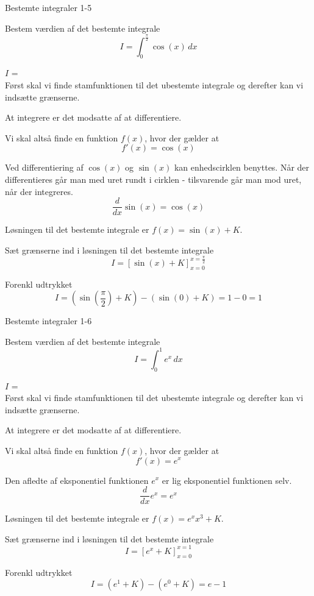 \documentclass{article}
\begin{document}
\newpage

\begin{exercise}{Bestemte integraler 1-5}
	
		Bestem værdien af det bestemte integrale
	\[
	I = \int_0^{\frac{\pi}{2}} \cos(x) \, dx
	\]
	
	$I$ =  \\
	
	
	\hint
	Først skal vi finde stamfunktionen til det ubestemte integrale og derefter kan vi indsætte grænserne.
	
	\hint
	At integrere er det modsatte af at differentiere.
	
	\hint
	Vi skal altså finde en funktion $f(x)$, hvor der gælder at
	\[
	f'(x) = \cos(x)
	\]
	
	\hint
	Ved differentiering af $\cos(x)$ og $\sin(x)$ kan enhedscirklen benyttes. Når der differentieres går man med uret rundt i cirklen - tilsvarende går man mod uret, når der integreres. 
	\[
	\frac{d}{dx} \sin(x) = \cos(x)
	\]
	
	\hint
	Løsningen til det bestemte integrale er $f(x) = \sin(x) + K$.
	
	\hint
	Sæt grænserne ind i løsningen til det bestemte integrale
	\[
	I = \left[ \sin(x) + K \right]_{x=0}^{x=\frac{\pi}{2}}
	\]
	
	\hint
	Forenkl udtrykket
	\[
	I = \left( \sin\left(\frac{\pi}{2}\right) + K \right) - \left( \sin(0) + K \right) = 1 - 0 = 1
	\]
	
	
	
\end{exercise}

\newpage

\begin{exercise}{Bestemte integraler 1-6}
	
	Bestem værdien af det bestemte integrale
	\[
	I = \int_0^1 e^x \, dx
	\]
	
	$I$ =  \\
	
	
	\hint
	Først skal vi finde stamfunktionen til det ubestemte integrale og derefter kan vi indsætte grænserne.
	
	\hint
	At integrere er det modsatte af at differentiere.
	
	\hint
	Vi skal altså finde en funktion $f(x)$, hvor der gælder at
	\[
	f'(x) = e^x
	\]
	
	\hint
	Den afledte af eksponentiel funktionen $e^x$ er lig eksponentiel funktionen selv. 
	\[
	\frac{d}{dx} e^x= e^x
	\]
	
	\hint
	Løsningen til det bestemte integrale er $f(x) = e^x x^3 + K$.
	
	\hint
	Sæt grænserne ind i løsningen til det bestemte integrale
	\[
	I = \left[ e^x + K \right]_{x=0}^{x=1}
	\]
	
	\hint
	Forenkl udtrykket
	\[
	I = \left( e^1 + K \right) - \left( e^0 + K \right) = e-1
	\]
	
	
\end{exercise}
\end{document}
